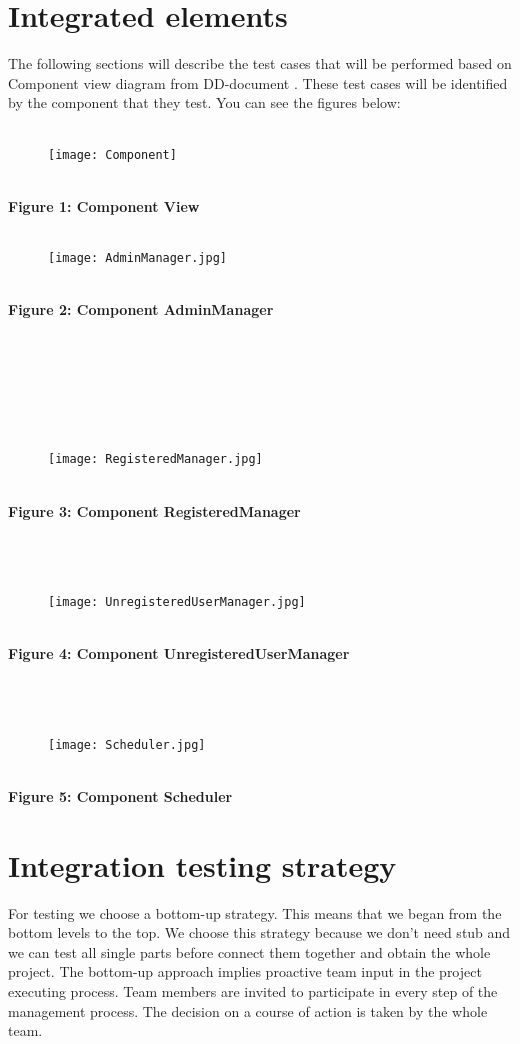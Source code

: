 \documentclass[12pt, oneside]{book}   	%
\begin{document}
\section{Integrated elements}
The following sections will describe the test cases that will be performed based on Component view diagram from DD-document . These test cases will be identified by the component that they test.
You can see the figures below:
\\
\\
\begin{figure}[h]
\centering
\texttt{[image: Component]}
\end{figure}
\\
\textbf{Figure 1: Component View}
\\
\\
\begin{figure}[h]
\centering
\texttt{[image: AdminManager.jpg]}
\end{figure}
\\
{\textbf{Figure 2: Component AdminManager}}
\\
\\
\\
\\
\\
\\
\\
\begin{figure}[h]
\centering
\texttt{[image: RegisteredManager.jpg]}
\end{figure}
\\
{\textbf{Figure 3: Component RegisteredManager}}
\\
\\
\\
\\
\begin{figure}[h]
\centering
\texttt{[image: UnregisteredUserManager.jpg]}
\end{figure}
\\
{\textbf{Figure 4: Component UnregisteredUserManager}}
\\
\\
\\
\\
\begin{figure}[h]
\centering
\texttt{[image: Scheduler.jpg]}
\end{figure}
\\
{\textbf{Figure 5: Component Scheduler}}
\clearpage
\section{Integration testing strategy}
For testing we choose a bottom-up strategy. This means that we began from the bottom levels to the top. We choose this strategy because we don't need stub and we can test all single parts before connect them together and obtain the whole project. 
The bottom-up approach implies proactive team input in the project executing process. Team members are invited to participate in every step of the management process. The decision on a course of action is taken by the whole team.
\end{document}
